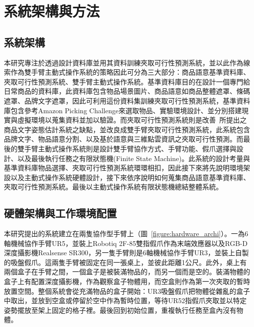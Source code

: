 \chapter{系統架構與方法}
\label{chapter:system}



\section{系統架構}
\label{sec:systemarchi}
本研究專注於透過設計資料庫並用其資料訓練夾取可行性預測系統，並以此作為線索作為雙手臂主動式操作系統的策略因此可分為三大部分：商品語意基準資料庫、夾取可行性預測系統、雙手臂主動式操作系統。基準資料庫目的在設計一個專門給日常商品的資料庫，此資料庫包含物品場景圖片、商品語意如商品整體遮罩、條碼遮罩、品牌文字遮罩，因此可利用這份資料集訓練夾取可行性預測系統，基準資料庫包含參考Amazon Picking Challenge來選取物品、實驗環境設計、並分別搭建現實與虛擬環境以蒐集資料並加以驗證。而夾取可行性預測系統則是改善~\cite{peterthesis}所提出之商品文字姿態估計系統之缺點，並改良成雙手臂夾取可行性預測系統，此系統包含品牌文字、物品語意分割、以及基於語意與三維點雲資訊之夾取可行性預測。而最後的雙手臂主動式操作系統則是設計雙手臂協作方式、手臂功能、假爪選擇與設計、以及最後執行任務之有限狀態機(Finite State Machine)。此系統的設計考量與基準資料庫物品選擇、夾取可行性預測系統環環相扣，因此接下來將先說明環境架設以及主動式操作系統硬體設計，接下來依序說明如何蒐集商品語意基準資料庫、夾取可行性預測系統。最後以主動式操作系統有限狀態機總結整體系統。

\section{硬體架構與工作環境配置}
本研究提出的系統建立在兩隻協作型手臂上（圖~\ref{figure:hardware_archi}）。一為6軸機械協作手臂UR5，並裝上Robotiq 2F-85雙指假爪作為末端效應器以及RGB-D深度攝影機Realsense SR300，另一隻手臂則是6軸機械協作手臂UR3，並裝上自製的吸盤假爪。這兩隻手臂被固定在同一張桌上，並彼此距離1公尺。此外，桌上有兩個盒子在手臂之間，一個盒子是被裝滿物品的，而另一個而是空的。裝滿物體的盒子上有配置深度攝影機，作為觀察盒子物體用，而空盒則作為第一次夾取的暫時放置空間。整個系統會從充滿物品的盒子開始：UR3吸盤假爪把物體從雜亂的盒子中取出，並放到空盒或停留於空中作為暫時位置，等待UR52指假爪夾取並以特定姿勢擺放至架上固定的格子裡。最後回到初始位置，重複執行任務至盒內沒有物體。

